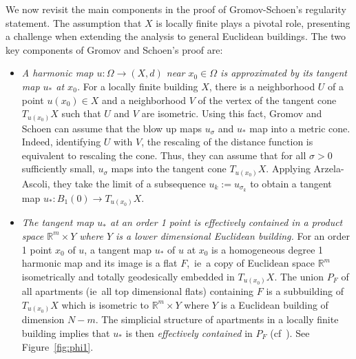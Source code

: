\documentclass[12pt]{amsart}
\theoremstyle{definition}
\numberwithin{equation}{section}
\newcommand{\R}{\mathbb R}
\begin{document}
   

We now revisit the main components in the proof of Gromov-Schoen's regularity statement. The assumption that $X$ is locally finite plays a pivotal role, presenting a challenge when extending the analysis to general Euclidean buildings.  The two key components of Gromov and Schoen's proof are:

\begin{itemize}
\item[(1)]
{\it A harmonic map $u:\Omega \rightarrow (X,d)$ near $x_0 \in \Omega$ is approximated by its tangent map $u_*$ at $x_0$.} For a locally finite building $X$, there is a neighborhood $U$ of a point $u(x_0) \in X$ and a neighborhood $V$ of the vertex of the tangent cone $T_{u(x_0)}X$ such that $U$ and $V$ are isometric.  Using this fact,  Gromov and Schoen can assume that the blow up maps $u_\sigma$ and $u_*$ map  into a metric cone.  Indeed, identifying $U$ with $V$, the rescaling of the distance function is equivalent to rescaling the cone.  Thus, they can assume that for all $\sigma>0$ sufficiently small, $u_\sigma$  maps into the  tangent cone $T_{u(x_0)}X$. Applying Arzela-Ascoli, they take the limit of a subsequence $u_k:=u_{\sigma_k}$ to obtain a tangent map $u_*:B_1(0) \rightarrow T_{u(x_0)}X$.  
\item[(2)] 
{\it The  tangent map $u_*$ at an order 1 point is effectively contained in a product space $\R^m \times Y$ where $Y$ is a lower dimensional Euclidean building.} For an order 1 point $x_0$ of $u$, a tangent map $u_*$ of $u$ at $x_0$ is a homogeneous degree 1 harmonic map and its image is a flat $F$,~ie~a copy of Euclidean space $\R^m$ isometrically and totally geodesically embedded in $T_{u(x_0)}X$.  The union $P_F$ of all apartments (ie~all top dimensional  flats) containing $F$ is a subbuilding of $T_{u(x_0)}X$ which  is isometric to $\R^m \times Y$ where $Y$ is a Euclidean building of dimension $N-m$.   The simplicial structure of apartments in a locally finite building implies that $u_*$ is then {\it effectively contained} in $P_F$ (cf~\cite[Section 5]{gromov-schoen}).  See Figure~\ref{fig:phi1}.
\end{itemize}
\end{document}

